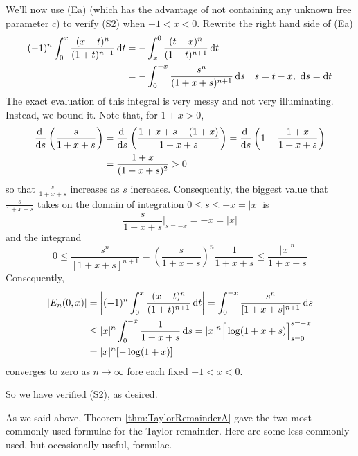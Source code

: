 \begin{eg}
\begin{description}
We'll now use (Ea) (which has the advantage of not containing any unknown free parameter $c$)
to verify (S2) when $-1<x<0$. Rewrite the right hand side of (Ea)
\begin{align*}
 (-1)^n \int_0^x \frac{(x-t)^n}{(1+t)^{n+1}}\,\mathrm{d}t
& =-\int_x^0 \frac{(t-x)^n}{(1+t)^{n+1}}\,\mathrm{d}t \\
&=-\int_0^{-x}\frac{s^n}{(1+x+s)^{n+1}}\,\mathrm{d}s
\quad s=t-x,\ \mathrm{d}s=\mathrm{d}t 
\end{align*}
The exact evaluation of this integral is very messy and not very illuminating. Instead,
we bound it.
Note that, for $1+x>0$,
\begin{align*}
\diff{}{s}\left(\frac{s}{1+x+s}\right) 
&= \diff{}{s}\left(\frac{1+x+s-(1+x)}{1+x+s} \right)
= \diff{}{s}\left(1- \frac{1+x}{1+x+s}\right) \\
&=\frac{1+x}{(1+x+s)^2}
>0
\end{align*}
so that $\frac{s}{1+x+s}$ increases as $s$ increases. Consequently, the biggest value that $\frac{s}{1+x+s}$ takes on the domain of integration 
$0\le s\le -x=|x|$ is
\begin{equation*}
\frac{s}{1+x+s}\bigg|_{s=-x} = -x = |x|
\end{equation*}
and the integrand
\begin{equation*}
0\le \frac{s^n}{[1+x+s]^{n+1}} 
  =\left(\frac{s}{1+x+s}\right)^n\frac{1}{1+x+s}
  \le \frac{|x|^n}{1+x+s}
\end{equation*}
Consequently,
\begin{align*}
\left|E_n(0,x)\right| 
&= \left|(-1)^n \int_0^x \frac{(x-t)^n}{(1+t)^{n+1}}\,\mathrm{d}t\right|
=\int_0^{-x}\frac{s^n}{[1+x+s]^{n+1}}\,\mathrm{d}s \\
&\le |x|^n \int_0^{-x}\frac{1}{1+x+s}\,\mathrm{d}s
=|x|^n\Big[\log(1+x+s)\Big]_{s=0}^{s=-x} \\
&= |x|^n [-\log(1+x)]
\end{align*}
converges to zero as $n\rightarrow\infty$ fore each fixed $-1<x<0$.
\end{description}
So we have verified (S2), as desired.

\end{eg}

As we said above, Theorem \ref{thm:TaylorRemainderA} gave the two most
commonly used formulae for the Taylor remainder. Here are some less commonly used, but occasionally useful, formulae.

